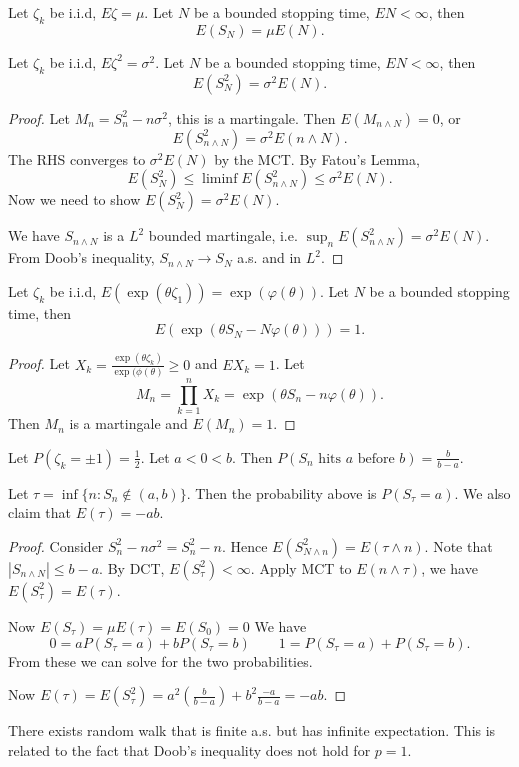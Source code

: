
\begin{theorem}
		Let $\zeta_k$ be i.i.d, $E\zeta = \mu$. Let $N$ be a bounded stopping time, $EN < \infty $, then
	\[
		E(S_N) = \mu E(N)
	.\] 
\end{theorem}

\begin{theorem}
	Let $\zeta_k$ be i.i.d, $E\zeta^2 = \sigma^2$. Let $N$ be a bounded stopping time, $EN < \infty $, then
	\[
		E(S_N^2) = \sigma^2 E(N)
	.\] 
\end{theorem}
\begin{proof}
	Let $M_n = S^2_n -n \sigma^2$, this is a martingale. Then
	$E(M_{n \wedge N}) = 0$, or
	\[
		E(S^2_{n \wedge N}) = \sigma^2 E(n \wedge N)
	.\] 
	The RHS converges to $\sigma^2 E(N)$ by the MCT. By Fatou's Lemma,
	\[
		E(S^2_N) \le \liminf E(S^2_{n \wedge N}) \le \sigma^2 E(N)
	.\] 
	Now we need to show $E(S^2_N) = \sigma^2 E(N)$.

	We have $S_{n \wedge N}$ is a $L^2$ bounded martingale, i.e. $\sup _n E(S^2_{n \wedge N}) = \sigma^2 E(N)$. From Doob's inequality, $S_{n \wedge N} \to  S_N$ a.s. and in $L^2$.
\end{proof}

\begin{theorem}
	Let $\zeta_k$ be i.i.d, $E(\exp(\theta \zeta_1)) = \exp(\varphi(\theta))$. Let $N$ be a bounded stopping time, then
	\[
		E\left( \exp\left( \theta S_N - N \varphi(\theta) \right)  \right) = 1
	.\] 
\end{theorem}
\begin{proof}
	Let $X_k = \frac{\exp(\theta \zeta_k)}{\exp(\phi(\theta)}\ge 0$ and $EX_k = 1$. Let
	\[
		M_n = \prod_{k=1}^{n} X_k = \exp\left( \theta S_n - n \varphi(\theta) \right)  
	.\] 
	Then $M_n$ is a martingale and $E(M_n) = 1$.
\end{proof}


\begin{theorem}
	Let $P(\zeta_k = \pm 1) = \frac{1}{2}$. Let $a < 0 < b$. Then $P\left(S_n \text{ hits $a$ before $b$} \right) = \frac{b}{b-a}$.

	Let $\tau = \inf\{n: S_n \not\in (a,b)\} $. Then the probability above is $P(S_\tau = a)$. We also claim that $E(\tau) = - ab$.
\end{theorem}
\begin{proof}
	Consider $S^2 _n -  n \sigma^2 = S_n^2 - n$. Hence $E(S^2_{N \wedge n}) = E(\tau \wedge n)$. Note that $|S_{n \wedge N}| \le b - a$. By DCT, $E(S^2_\tau) < \infty $. Apply MCT to $E(n \wedge \tau)$, we have $E(S^2_\tau) = E(\tau)$.

	Now $E(S_\tau) = \mu E(\tau) = E(S_0) = 0$
	We have
	\[
		0 = a P(S_\tau = a) + b P(S_\tau = b)
		\qquad
		1 = P(S_\tau = a) + P(S_\tau = b)
	.\] 
	From these we can solve for the two probabilities.

	Now $E(\tau) = E(S^2_\tau) = a^2 (\frac{b}{b-a}) + b^2 \frac{-a}{b-a} = - ab$.
\end{proof}

\begin{remark}
	There exists random walk that is finite a.s. but has infinite expectation. This is related to the fact that Doob's inequality does not hold for $p = 1$.
\end{remark}
